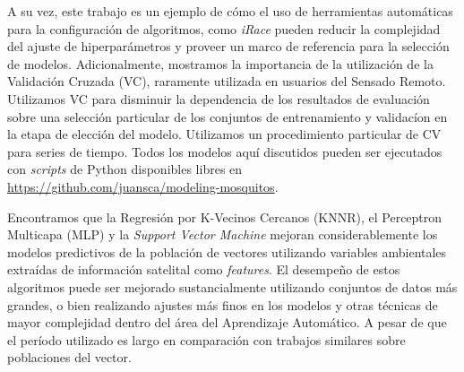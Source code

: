   \par A su vez, este trabajo es un ejemplo de cómo el uso de herramientas
    automáticas para la configuración de algoritmos, como \textit{iRace} pueden
    reducir la complejidad del ajuste de hiperparámetros y
    proveer un marco de referencia para la selección de modelos.
    Adicionalmente, mostramos la importancia de la utilización de la Validación
    Cruzada (VC), raramente utilizada en usuarios del Sensado Remoto.
    Utilizamos VC para disminuir la dependencia de los resultados de evaluación
    sobre una selección particular de los conjuntos de entrenamiento y validacíon
    en la etapa de elección del modelo. Utilizamos
    un procedimiento particular de CV para series de tiempo. Todos los modelos
    aquí discutidos pueden ser ejecutados con \textit{scripts} de Python
    disponibles libres en \url{https://github.com/juansca/modeling-mosquitos}.

  \par Encontramos que la Regresión por K-Vecinos Cercanos (KNNR), el
    Perceptron Multicapa (MLP) y la \textit{Support Vector Machine} mejoran
    considerablemente los modelos predictivos de la población de vectores utilizando
    variables ambientales extraídas de información satelital como \textit{features}.
    El desempeño de estos algoritmos puede ser mejorado sustancialmente utilizando
    conjuntos de datos más grandes, o bien realizando ajustes más finos en los modelos
    y otras técnicas de mayor complejidad dentro del área del Aprendizaje Automático.
    A pesar de que el período utilizado es largo en comparación con trabajos similares
    sobre poblaciones del vector.


